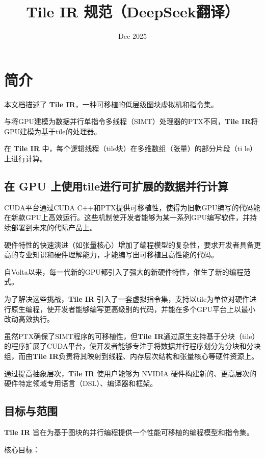 \documentclass{article}
\title{Tile IR 规范（DeepSeek翻译）}
\author{}
\date{Dec 2025}
\begin{document}
\maketitle
\tableofcontents
\newpage
\section{简介}

本文档描述了 \textbf{Tile IR}，一种可移植的低层级图块虚拟机和指令集。


与将GPU建模为数据并行单指令多线程（SIMT）处理器的PTX不同，\textbf{Tile IR}将GPU建模为基于tile的处理器。

在 \textbf{Tile IR} 中，每个逻辑线程（tile块）在多维数组（张量）的部分片段（ti le）上进行计算。


\subsection{在 GPU 上使用tile进行可扩展的数据并行计算}

CUDA平台通过CUDA C++和PTX提供可移植性，使得为旧款GPU编写的代码能在新款GPU上高效运行。这些机制使开发者能够为某一系列GPU编写软件，并持续部署到未来的代际产品上。


硬件特性的快速演进（如张量核心）增加了编程模型的复杂性，要求开发者具备更高的专业知识和硬件理解能力，才能编写出可移植且高性能的代码。

自Volta以来，每一代新的GPU都引入了强大的新硬件特性，催生了新的编程范式。


为了解决这些挑战，\textbf{Tile IR} 引入了一套虚拟指令集，支持以tile为单位对硬件进行原生编程，使开发者能够编写更高级别的代码，并能在多个GPU平台上以最小改动高效执行。


虽然PTX确保了SIMT程序的可移植性，但\textbf{Tile IR}通过原生支持基于分块（tile）的程序扩展了CUDA平台，使开发者能够专注于将数据并行程序划分为分块和分块组，而由\textbf{Tile IR}负责将其映射到线程、内存层次结构和张量核心等硬件资源上。


通过提高抽象层次，\textbf{Tile IR} 使用户能够为 NVIDIA 硬件构建新的、更高层次的硬件特定领域专用语言（DSL）、编译器和框架。



\subsection{目标与范围}

\textbf{Tile IR} 旨在为基于图块的并行编程提供一个性能可移植的编程模型和指令集。


核心目标：
\end{document}
